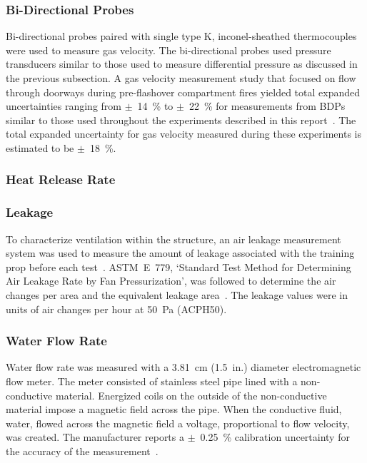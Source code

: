 \documentclass[12pt,oneside]{book}
\begin{document}
\subsubsection*{Bi-Directional Probes}
Bi-directional probes paired with single type K, inconel-sheathed thermocouples were used to measure gas velocity. The bi-directional probes used pressure transducers similar to those used to measure differential pressure as discussed in the previous subsection. A gas velocity measurement study that focused on flow through doorways during pre-flashover compartment fires yielded total expanded uncertainties ranging from $\pm$~14~\% to $\pm$~22~\% for measurements from BDPs similar to those used throughout the experiments described in this report~\cite{Bryant:FSJ2009}. The total expanded uncertainty for gas velocity measured during these experiments is estimated to be $\pm$~18~\%. 

\subsubsection*{Heat Release Rate}

\subsubsection*{Leakage} 
To characterize ventilation within the structure, an air leakage measurement system was used to measure the amount of leakage associated with the training prop before each test~\cite{retrotec:leakage}. ASTM~E~779, `Standard Test Method for Determining Air Leakage Rate by Fan Pressurization', was followed to determine the air changes per area and the equivalent leakage area~\cite{astm_e779}. The leakage values were in units of air changes per hour at 50~Pa (ACPH50). 

\subsubsection*{Water Flow Rate}
Water flow rate was measured with a 3.81~cm (1.5~in.) diameter electromagnetic flow meter. The meter consisted of stainless steel pipe lined with a non-conductive material. Energized coils on the outside of the non-conductive material impose a magnetic field across the pipe. When the conductive fluid, water, flowed across the magnetic field a voltage, proportional to flow velocity, was created. The manufacturer reports a $\pm$~0.25~\% calibration uncertainty for the accuracy of the measurement~\cite{Badger:2015}. 
\end{document}
